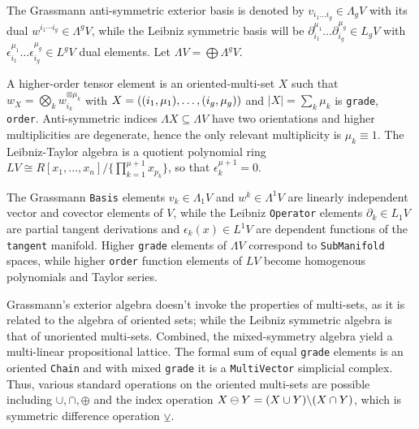 \documentclass{juliacon}
\begin{document}
\begin{definition}
	The Grassmann anti-symmetric exterior basis is denoted by $v_{i_1\dots i_g}\in\Lambda_gV$ with its dual $w^{i_1\cdots i_g}\in\Lambda^gV$, while the Leibniz symmetric basis will be $\partial_{i_1}^{\mu_1}\dots\partial_{i_g}^{\mu_g}\in L_gV$ with $\epsilon_{i_1}^{\mu_1}\dots\epsilon_{i_g}^{\mu_g}\in L^gV$ dual elements. Let $\Lambda V = \bigoplus \Lambda^g V$.
\end{definition}
A higher-order tensor element is an oriented-multi-set $X$ %
such that $w_X = \bigotimes_k w_{i_k}^{\otimes\mu_k}$ with $X = \left((i_1,\mu_1),\dots,(i_g,\mu_g)\right)$ and $|X|=\sum_k\mu_k$ is \verb`grade`,$\,$ \verb`order`.
Anti-symmetric indices $\Lambda X\subseteq\Lambda V$ have two orientations and higher multiplicities are degenerate, hence the only relevant multiplicity is $\mu_k\equiv 1$.
The Leibniz-Taylor algebra \cite{taylor-algebra} is a quotient polynomial ring $LV\cong R[x_1,\dots,x_n]/\{\prod_{k=1}^{\mu+1} x_{p_k}\}$, so that $\epsilon_k^{\mu+1}=0$. %

The Grassmann \verb`Basis` elements $v_k\in\Lambda_1V$ and $w^k\in\Lambda^1V$ are linearly independent vector and covector elements of $V$, while the Leibniz \verb`Operator` elements $\partial_k\in L_1V$ are partial tangent derivations and $\epsilon_k(x)\in L^1V$ are dependent functions of the \verb`tangent` manifold. 
Higher \verb`grade` elements of $\Lambda V$ correspond to \verb`SubManifold` spaces, while higher \verb`order` function elements of $LV$ become homogenous polynomials and Taylor series.

Grassmann's exterior algebra doesn't invoke the properties of multi-sets, as it is related to the algebra of oriented sets; while the Leibniz symmetric algebra is that of unoriented multi-sets.
Combined, the mixed-symmetry algebra yield a multi-linear propositional lattice.
The formal sum of equal \verb`grade` elements is an oriented \verb`Chain` and with mixed \verb`grade` it is a \verb`MultiVector` simplicial complex.
Thus, various standard operations on the oriented multi-sets are possible including $\cup,\cap,\oplus$ and the index operation $X\ominus Y=(X\cup Y)\backslash(X\cap Y)$, which is symmetric difference operation $\veebar$.
\end{document}
